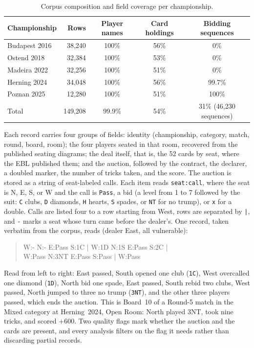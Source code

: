 \documentclass[runningheads]{llncs}
\begin{document}
\begin{table}[h]
\centering\small
\caption{Corpus composition and field coverage per championship.}
\label{tab:data}
\begin{tabular}{lrccc}
\toprule
Championship & Rows & Player names & Card holdings & Bidding sequences\\
\midrule
Budapest 2016 & 38{,}240 & 100\% & 56\% & 0\%\\
Ostend 2018   & 32{,}384 & 100\% & 53\% & 0\%\\
Madeira 2022  & 32{,}256 & 100\% & 51\% & 0\%\\
Herning 2024  & 34{,}048 & 100\% & 56\% & 99.7\%\\
Poznan 2025   & 12{,}280 & 100\% & 51\% & 100\%\\
\midrule
Total & 149{,}208 & 99.9\% & 54\% & 31\% (46{,}230 sequences)\\
\bottomrule
\end{tabular}
\end{table}

Each record carries four groups of fields: identity (championship,
category, match, round, board, room); the four players seated in that
room, recovered from the published seating diagrams; the deal itself,
that is, the 52 cards by seat, where the EBL published them; and the
auction, followed by the contract, the declarer, a doubled marker, the
number of tricks taken, and the score. The auction is stored as a
string of seat-labeled calls. Each item reads \texttt{seat:call}, where
the seat is N, E, S, or W and the call is \texttt{Pass}, a bid (a
level from 1 to 7 followed by the suit: \texttt{C} clubs, \texttt{D}
diamonds, \texttt{H} hearts, \texttt{S} spades, or \texttt{NT} for no
trump), or \texttt{x} for a double. Calls are listed four to a row
starting from West, rows are separated by \texttt{|}, and \texttt{-}
marks a seat whose turn came before the dealer's. One record, taken
verbatim from the corpus, reads (dealer East, all vulnerable):

\begin{quote}\small\ttfamily
W:- N:- E:Pass S:1C | W:1D N:1S E:Pass S:2C |\\
W:Pass N:3NT E:Pass S:Pass | W:Pass
\end{quote}

\noindent Read from left to right: East passed, South opened one club
(\texttt{1C}), West overcalled one diamond (\texttt{1D}), North bid
one spade, East passed, South rebid two clubs, West passed, North
jumped to three no trump (\texttt{3NT}), and the other three players
passed, which ends the auction. This is Board~10 of a Round-5 match
in the Mixed category at Herning~2024, Open Room: North played 3NT,
took nine tricks, and scored $+600$. Two quality flags mark whether
the auction and the cards are present, and every analysis filters on
the flag it needs rather than discarding partial records.
\end{document}
